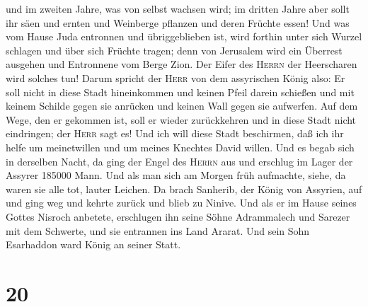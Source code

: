 und im zweiten Jahre, was von selbst wachsen wird; im dritten Jahre aber
sollt ihr säen und ernten und Weinberge pflanzen und deren Früchte
essen!  Und was vom Hause Juda entronnen und
übriggeblieben ist, wird forthin unter sich Wurzel schlagen und über
sich Früchte tragen;  denn von Jerusalem wird ein
Überrest ausgehen und Entronnene vom Berge Zion. Der Eifer des
\textsc{Herrn} der Heerscharen wird solches tun!  Darum
spricht der \textsc{Herr} von dem assyrischen König also: Er soll nicht
in diese Stadt hineinkommen und keinen Pfeil darein schießen und mit
keinem Schilde gegen sie anrücken und keinen Wall gegen sie aufwerfen.
 Auf dem Wege, den er gekommen ist, soll er wieder
zurückkehren und in diese Stadt nicht eindringen; der \textsc{Herr} sagt
es!  Und ich will diese Stadt beschirmen, daß ich ihr
helfe um meinetwillen und um meines Knechtes David willen.
 Und es begab sich in derselben Nacht, da ging der Engel
des \textsc{Herrn} aus und erschlug im Lager der Assyrer 185000 Mann.
Und als man sich am Morgen früh aufmachte, siehe, da waren sie alle tot,
lauter Leichen.  Da brach Sanherib, der König von
Assyrien, auf und ging weg und kehrte zurück und blieb zu Ninive.
 Und als er im Hause seines Gottes Nisroch anbetete,
erschlugen ihn seine Söhne Adrammalech und Sarezer mit dem Schwerte, und
sie entrannen ins Land Ararat. Und sein Sohn Esarhaddon ward König an
seiner Statt.

\hypertarget{section-19}{%
\section{20}\label{section-19}}


